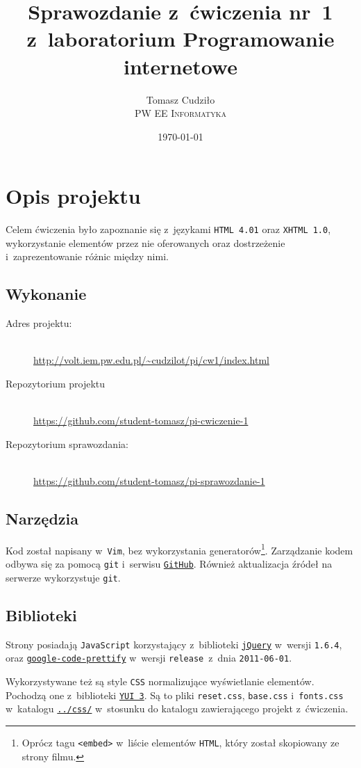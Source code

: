 \documentclass[10pt,a4paper]{article}
\newcommand{\f}[1]{\texttt{#1}}
\begin{document}
\title{
  Sprawozdanie z~ćwiczenia nr~1\\z~laboratorium Programowanie internetowe
}
\author{
  Tomasz Cudziło\\
  \textsc{PW EE Informatyka}\\[10pt]
}
\date{\today}
\maketitle

\section{Opis projektu}
Celem ćwiczenia było zapoznanie się z~językami \f{HTML 4.01} oraz \f{XHTML 1.0},
wykorzystanie elementów przez nie oferowanych oraz dostrzeżenie
i~zaprezentowanie różnic między nimi.

\subsection{Wykonanie}
\begin{description}
  \item[Adres projektu:] \hfill \\
  \url{http://volt.iem.pw.edu.pl/~cudzilot/pi/cw1/index.html}
  \item[Repozytorium projektu] \hfill \\
  \url{https://github.com/student-tomasz/pi-cwiczenie-1}
  \item[Repozytorium sprawozdania:] \hfill \\
  \url{https://github.com/student-tomasz/pi-sprawozdanie-1}
\end{description}

\subsection{Narzędzia}
Kod został napisany w~\f{Vim}, bez wykorzystania generatorów\footnote{Oprócz
tagu \f{<embed>} w~liście elementów \f{HTML}, który został skopiowany ze strony
filmu.}. Zarządzanie kodem odbywa się za pomocą \f{git} i~serwisu
\f{\href{https://github.com/}{GitHub}}. Również aktualizacja źródeł na serwerze
wykorzystuje \f{git}.

\subsection{Biblioteki}
Strony posiadają \f{JavaScript} korzystający z~biblioteki
\f{\href{http://jquery.com/}{jQuery}} w~wersji \f{1.6.4}, oraz
\f{\href{http://code.google.com/p/google-code-prettify/}{google-code-prettify}}
w~wersji \f{release}~z~dnia \f{2011-06-01}.

Wykorzystywane też są style \f{CSS} normalizujące wyświetlanie elementów.
Pochodzą one z~biblioteki \f{\href{http://yuilibrary.com/}{YUI 3}}. Są to pliki
\f{reset.css}, \f{base.css} i~\f{fonts.css} w~katalogu
\f{\href{https://github.com/student-tomasz/pi-laboratoria/tree/master/css}{../css/}}
w~stosunku do katalogu zawierającego projekt z~ćwiczenia.
\end{document}
